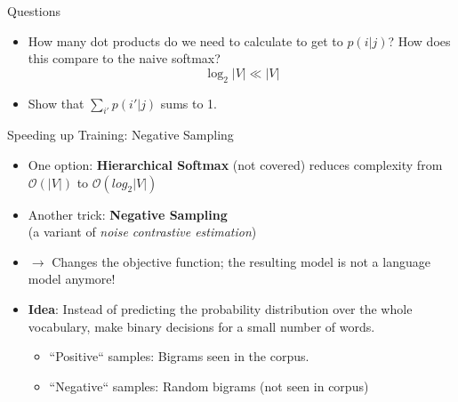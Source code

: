 
\begin{vbframe}{Questions}

\vfill

\begin{itemize}
	\item \ques How many dot products do we need to calculate to get to $p(i|j)$? How does this compare to the naive softmax?
		 $$\log_2|V| \ll |V|$$

	\vskip5mm
	\item \ques Show that $\sum_{i'} p(i'|j)$ sums to 1.
\end{itemize}

\vfill

\end{vbframe}

\fi


\begin{vbframe}{Speeding up Training: Negative Sampling}

\vfill

\begin{itemize}
	\item One option: \textbf{Hierarchical Softmax} (not covered) reduces complexity from $\mathcal{O}(|V|)$ to $\mathcal{O}(log_2|V|)$
	\item Another trick: \textbf{Negative Sampling}\\ (a variant of \emph{noise contrastive estimation})
	\item[] $\to$ Changes the objective function; the resulting model is not a language model anymore!
	\item \textbf{Idea}: Instead of predicting the probability distribution over the whole vocabulary, make binary decisions for a small number of words.
			\begin{itemize}
				\item ``Positive`` samples: Bigrams seen in the corpus.
				\item ``Negative`` samples: Random bigrams (not seen in corpus)
			\end{itemize}
\end{itemize}

\vfill

\end{vbframe}



